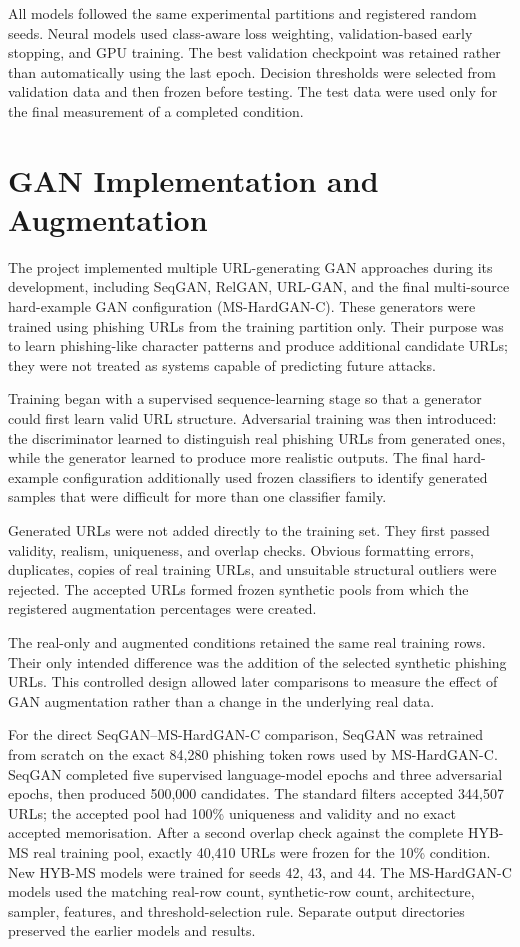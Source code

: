 All models followed the same experimental partitions and registered random
seeds. Neural models used class-aware loss weighting, validation-based early
stopping, and GPU training. The best validation checkpoint was retained rather
than automatically using the last epoch. Decision thresholds were selected
from validation data and then frozen before testing. The test data were used
only for the final measurement of a completed condition.

\section{GAN Implementation and Augmentation}

The project implemented multiple URL-generating GAN approaches during its
development, including SeqGAN, RelGAN, URL-GAN, and the final multi-source
hard-example GAN configuration (MS-HardGAN-C). These generators were trained
using phishing URLs from the training partition only. Their purpose was to
learn phishing-like character patterns and produce additional candidate URLs;
they were not treated as systems capable of predicting future attacks.

Training began with a supervised sequence-learning stage so that a generator
could first learn valid URL structure. Adversarial training was then introduced:
the discriminator learned to distinguish real phishing URLs from generated
ones, while the generator learned to produce more realistic outputs. The final
hard-example configuration additionally used frozen classifiers to identify
generated samples that were difficult for more than one classifier family.

Generated URLs were not added directly to the training set. They first passed
validity, realism, uniqueness, and overlap checks. Obvious formatting errors,
duplicates, copies of real training URLs, and unsuitable structural outliers
were rejected. The accepted URLs formed frozen synthetic pools from which the
registered augmentation percentages were created.

The real-only and augmented conditions retained the same real training rows.
Their only intended difference was the addition of the selected synthetic
phishing URLs. This controlled design allowed later comparisons to measure the
effect of GAN augmentation rather than a change in the underlying real data.

For the direct SeqGAN--MS-HardGAN-C comparison, SeqGAN was retrained from
scratch on the exact 84,280 phishing token rows used by MS-HardGAN-C. SeqGAN
completed five supervised language-model epochs and three adversarial epochs,
then produced 500,000 candidates. The standard filters accepted 344,507 URLs;
the accepted pool had 100\% uniqueness and validity and no exact accepted
memorisation. After a second overlap check against the complete HYB-MS real
training pool, exactly 40,410 URLs were frozen for the 10\% condition. New
HYB-MS models were trained for seeds 42, 43, and 44. The MS-HardGAN-C models
used the matching real-row count, synthetic-row count, architecture, sampler,
features, and threshold-selection rule. Separate output directories preserved
the earlier models and results.

